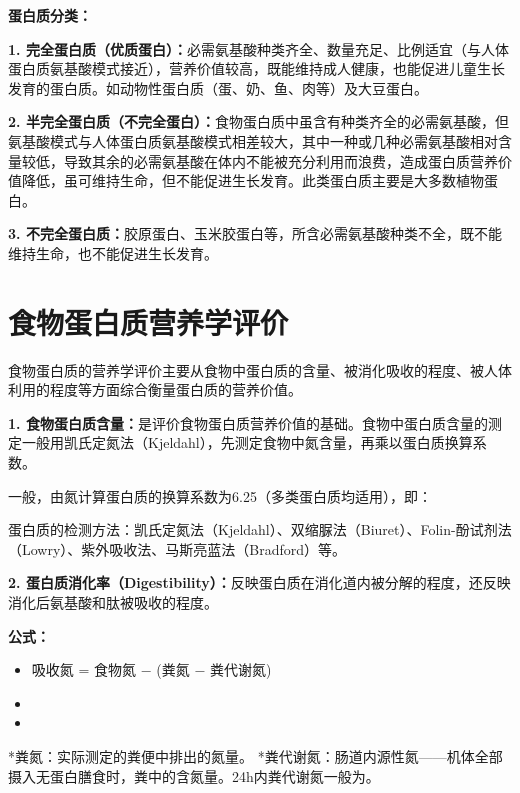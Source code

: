 \begin{defbox}
\textbf{蛋白质分类：}

\textbf{1. 完全蛋白质（优质蛋白）：}必需氨基酸种类齐全、数量充足、比例适宜（与人体蛋白质氨基酸模式接近），营养价值较高，既能维持成人健康，也能促进儿童生长发育的蛋白质。如动物性蛋白质（蛋、奶、鱼、肉等）及大豆蛋白。

\textbf{2. 半完全蛋白质（不完全蛋白）：}食物蛋白质中虽含有种类齐全的必需氨基酸，但氨基酸模式与人体蛋白质氨基酸模式相差较大，其中一种或几种必需氨基酸相对含量较低，导致其余的必需氨基酸在体内不能被充分利用而浪费，造成蛋白质营养价值降低，虽可维持生命，但不能促进生长发育。此类蛋白质主要是大多数植物蛋白。

\textbf{3. 不完全蛋白质：}胶原蛋白、玉米胶蛋白等，所含必需氨基酸种类不全，既不能维持生命，也不能促进生长发育。
\end{defbox}

\section{食物蛋白质营养学评价}

食物蛋白质的营养学评价主要从食物中蛋白质的含量、被消化吸收的程度、被人体利用的程度等方面综合衡量蛋白质的营养价值。

\begin{keybox}
\textbf{1. 食物蛋白质含量：}是评价食物蛋白质营养价值的基础。食物中蛋白质含量的测定一般用凯氏定氮法（Kjeldahl），先测定食物中氮含量，再乘以蛋白质换算系数。

一般，由氮计算蛋白质的换算系数为6.25（多类蛋白质均适用），即：

蛋白质的检测方法：凯氏定氮法（Kjeldahl）、双缩脲法（Biuret）、Folin-酚试剂法（Lowry）、紫外吸收法、马斯亮蓝法（Bradford）等。

\textbf{2. 蛋白质消化率（Digestibility）：}反映蛋白质在消化道内被分解的程度，还反映消化后氨基酸和肽被吸收的程度。

\textbf{公式：}
\begin{itemize}[leftmargin=*]
    \item 吸收氮 = 食物氮 $-$ (粪氮 $-$ 粪代谢氮)
    \item {}
    \item {}
\end{itemize}

*粪氮：实际测定的粪便中排出的氮量。
*粪代谢氮：肠道内源性氮——机体全部摄入无蛋白膳食时，粪中的含氮量。24h内粪代谢氮一般为。 %
\end{keybox}

